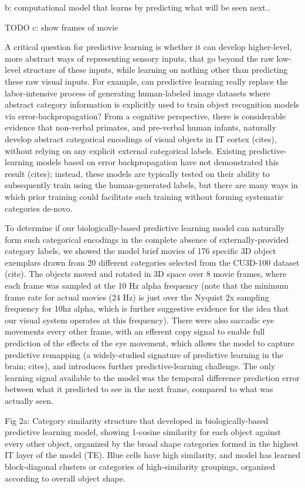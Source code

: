 \documentclass[11pt,twoside]{article}
\newif\myifpdf
\begin{document}
b: computational model that learns by predicting what will be seen next.. 

TODO c: show frames of movie

A critical question for predictive learning is whether it can develop higher-level, more abstract ways of representing sensory inputs, that go beyond the raw low-level structure of these inputs, while learning on nothing other than predicting these raw visual inputs.  For example, can predictive learning really replace the labor-intensive process of generating human-labeled image datasets where abstract category information is explicitly used to train object recognition models via error-backpropagation?  From a cognitive perspective, there is considerable evidence that non-verbal primates, and pre-verbal human infants, naturally develop abstract categorical encodings of visual objects in IT cortex (cites), without relying on any explicit external categorical labels.  Existing predictive-learning models based on error backpropagation have not demonstrated this result (cites); instead, these models are typically tested on their ability to subsequently train using the human-generated labels, but there are many ways in which prior training could facilitate such training without forming systematic categories de-novo.

To determine if our biologically-based predictive learning model can naturally form such categorical encodings in the complete absence of externally-provided category labels, we showed the model brief movies of 176 specific 3D object exemplars drawn from 20 different categories selected from the CU3D-100 dataset (cite).  The objects moved and rotated in 3D space over 8 movie frames, where each frame was sampled at the 10 Hz alpha frequency (note that the minimum frame rate for actual movies (24 Hz) is just over the Nyquist 2x sampling frequency for 10hz alpha, which is further suggestive evidence for the idea that our visual system operates at this frequency).  There were also saccadic eye movements every other frame, with an efferent copy signal to enable full prediction of the effects of the eye movement, which allows the model to capture predictive remapping (a widely-studied signature of predictive learning in the brain; cites), and introduces further predictive-learning challenge.  The only learning signal available to the model was the temporal difference prediction error between what it predicted to see in the next frame, compared to what was actually seen.  


Fig 2a: Category similarity structure that developed in biologically-based predictive learning model, showing 1-cosine similarity for each object against every other object, organized by the broad shape categories formed in the highest IT layer of the model (TE). Blue cells have high similarity, and model has learned block-diagonal clusters or categories of high-similarity groupings, organized according to overall object shape.
\end{document}
